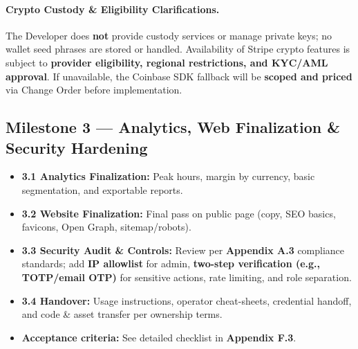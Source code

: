 \documentclass[11pt, a4paper]{article}
\begin{document}
\paragraph{Crypto Custody \& Eligibility Clarifications.}
The Developer does \textbf{not} provide custody services or manage private keys; no wallet seed phrases are stored or handled. Availability of Stripe crypto features is subject to \textbf{provider eligibility, regional restrictions, and KYC/AML approval}. If unavailable, the Coinbase SDK fallback will be \textbf{scoped and priced} via Change Order before implementation.

\subsection{Milestone 3 — Analytics, Web Finalization \& Security Hardening}
\begin{itemize}[leftmargin=*]
  \item \textbf{3.1 Analytics Finalization:} Peak hours, margin by currency, basic segmentation, and exportable reports.
  \item \textbf{3.2 Website Finalization:} Final pass on public page (copy, SEO basics, favicons, Open Graph, sitemap/robots).
  \item \textbf{3.3 Security Audit \& Controls:} Review per \textbf{Appendix A.3} compliance standards; add \textbf{IP allowlist} for admin, \textbf{two-step verification (e.g., TOTP/email OTP)} for sensitive actions, rate limiting, and role separation.
  \item \textbf{3.4 Handover:} Usage instructions, operator cheat-sheets, credential handoff, and code \& asset transfer per ownership terms.
  \item \textbf{Acceptance criteria:} See detailed checklist in \textbf{Appendix F.3}.
\end{itemize}

\end{document}
